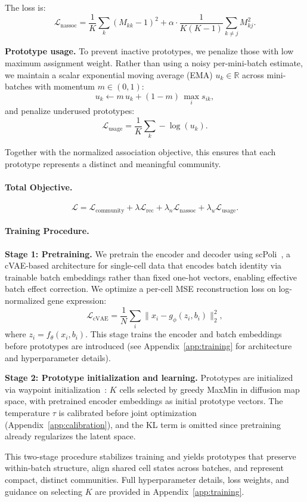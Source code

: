 The loss is:
\[
\mathcal{L}_{\text{nassoc}} =
\frac{1}{K} \sum_k (M_{kk} - 1)^2
+
\alpha \cdot \frac{1}{K(K-1)} \sum_{k \neq j} M_{kj}^2.
\]

\textbf{Prototype usage.}
To prevent inactive prototypes, we penalize those with low maximum assignment weight.
Rather than using a noisy per-mini-batch estimate, we maintain a scalar exponential moving average (EMA) $u_k \in \mathbb{R}$ across mini-batches with momentum $m \in (0,1)$:
\[
u_k \leftarrow m\, u_k + (1-m)\, \max_i s_{ik},
\]
and penalize underused prototypes:
\[
\mathcal{L}_{\text{usage}} = \frac{1}{K} \sum_k -\log(u_k).
\]

Together with the normalized association objective, this ensures that each prototype represents a distinct and meaningful community.

\paragraph{Total Objective.}
\[
\mathcal{L} =
\mathcal{L}_{\text{community}}
+
\lambda \mathcal{L}_{\text{rec}}
+
\lambda_n \mathcal{L}_{\text{nassoc}}
+
\lambda_u \mathcal{L}_{\text{usage}}.
\]

\paragraph{Training Procedure.}

\textbf{Stage 1: Pretraining.}
We pretrain the encoder and decoder using scPoli~\citep{scpoli}, a cVAE-based architecture for single-cell data that encodes batch identity via trainable batch embeddings rather than fixed one-hot vectors, enabling effective batch effect correction.
We optimize a per-cell MSE reconstruction loss on log-normalized gene expression:
\[
\mathcal{L}_{\text{cVAE}} =
\frac{1}{N}\sum_i \|x_i - g_\phi(z_i, b_i)\|_2^2,
\]
where $z_i = f_\theta(x_i, b_i)$. This stage trains the encoder and batch embeddings before prototypes are introduced (see Appendix~\ref{app:training} for architecture and hyperparameter details).

\textbf{Stage 2: Prototype initialization and learning.}
Prototypes are initialized via waypoint initialization~\citep{seacells}: $K$ cells selected by greedy MaxMin in diffusion map space, with pretrained encoder embeddings as initial prototype vectors. The temperature $\tau$ is calibrated before joint optimization (Appendix~\ref{app:calibration}), and the KL term is omitted since pretraining already regularizes the latent space.

This two-stage procedure stabilizes training and yields prototypes that preserve within-batch structure, align shared cell states across batches, and represent compact, distinct communities.
Full hyperparameter details, loss weights, and guidance on selecting $K$ are provided in Appendix~\ref{app:training}.